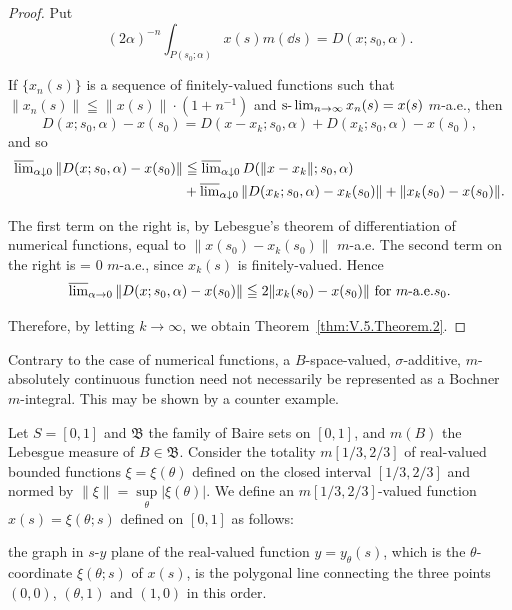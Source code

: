 \begin{proof}
 Put 
\[
(2 \alpha) ^{-n} \int_ {P (s _{0}; \alpha)} x (s) m (\dd s) = D (x; s _{0}, \alpha). \]

If $\{x_{n}(s)\}$ is a sequence of finitely-valued functions such that $\|x_{n}(s)\| \leqq \|x(s)\| \cdot (1 + n^{-1})$ and $\slim\limits_{n\to \infty}x_n(s) = x(s)$ $m$-a.e., then 
\[
D (x; s _{0}, \alpha) - x (s _{0}) = D (x - x _{k}; s _{0}, \alpha) + D (x _{k}; s _{0}, \alpha) - x (s _{0}),
\]
and so 
\[
\begin{aligned}
\varlimsup\limits_{\alpha \downarrow 0} \| D (x; s _{0}, \alpha) - x (s _{0}) \|& \leqq \varlimsup\limits_{\alpha \downarrow 0} D (\| x - x _{k} \|; s _{0}, \alpha)
\\
& + \varlimsup\limits_{\alpha \downarrow 0} \| D (x _{k}; s _{0}, \alpha) - x _{k} (s _{0}) \| + \| x _{k} (s _{0}) - x (s _{0}) \|.
\end{aligned}
\]

The first term on the right is, by Lebesgue's theorem of differentiation of numerical functions, equal to $\|x(s_0) - x_k(s_0)\|$ $m$-a.e. The second term on the right is = $0$ $m$-a.e., since $x_k(s)$ is finitely-valued. Hence 
\[
\varlimsup\limits_{\alpha \rightarrow 0} \| D (x; s _{0}, \alpha) - x (s _{0}) \| \leqq 2 \| x _{k} (s _{0}) - x (s _{0}) \| \text{ for } m\text{-a.e.} s _{0}.
\]

Therefore, by letting $k \to \infty$, we obtain Theorem~\ref{thm:V.5.Theorem.2}. 
\end{proof}

\begin{remarku} Contrary to the case of numerical functions, a $B$-space-valued, $\sigma$-additive, $m$-absolutely continuous function need not necessarily be represented as a Bochner $m$-integral. This may be shown by a counter example. 
\end{remarku}

\begin{examplen} Let $S = [0,1]$ and $\mathfrak{B}$ the family of Baire sets on $[0,1]$, and $m(B)$ the Lebesgue measure of $B \in \mathfrak{B}$. Consider the totality $m[1/3,2/3]$ of real-valued bounded functions $\xi = \xi(\theta)$ defined on the closed interval $[1/3,2/3]$ and normed by $\|\xi\| = \sup\limits_{\theta} |\xi(\theta)|$. We define an $m[1/3,2/3]$-valued function $x(s) = \xi(\theta; s)$ defined on $[0,1]$ as follows: 

the graph in $s$-$y$ plane of the real-valued function $y = y_{\theta}(s)$, which is the $\theta$-coordinate $\xi(\theta; s)$ of $x(s)$, is the polygonal line connecting the three points $(0, 0)$, $(\theta, 1)$ and $(1, 0)$ in this order. 
\end{examplen}

